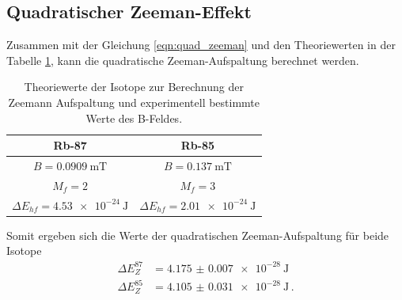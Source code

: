 \subsection{Quadratischer Zeeman-Effekt}
\label{sec:quadratischer-zeeman-effekt}

Zusammen mit der Gleichung \ref{eqn:quad_zeeman} und den Theoriewerten in der Tabelle \ref{tab:zee}, kann die
quadratische Zeeman-Aufspaltung berechnet werden.

\begin{table}
    \centering
    \caption{Theoriewerte der Isotope zur Berechnung der Zeemann Aufspaltung und experimentell bestimmte Werte des B-Feldes. \cite{pumpen}}
    \label{tab:zee}
    \begin{tabular}{c c}
        \toprule
        Rb-87 & Rb-85\\
        \midrule
        $B = \qty{0.0909}{\milli\tesla}$ & $B = \qty{0.137}{\milli\tesla}$ \\
        $M_f = 2$ & $M_f = 3$ \\
        $\Delta E_{hf} = \qty{4.53e-24}{\joule} $ & $\Delta E_{hf} = \qty{2.01e-24}{\joule} $ \\
        \bottomrule
    \end{tabular}
\end{table}

Somit ergeben sich die Werte der quadratischen Zeeman-Aufspaltung für beide Isotope
\begin{align}
    \Delta E_Z^{87} &= \qty{4.175(7)e-28}{\joule} \\
    \Delta E_Z^{85} &= \qty{4.105(31)e-28}{\joule} \,.
\end{align}